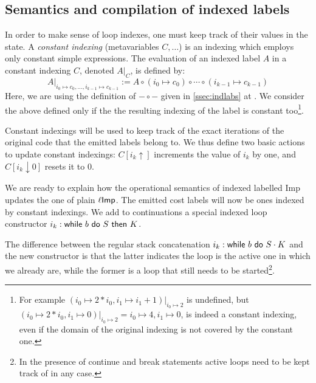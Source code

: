 \documentclass[submission,copyright,creativecommons]{eptcs}
\theoremstyle{definition}
\newcommand{\s}[1]{{\sf #1}}    \newcommand{\vc}[1]{{\bf #1}}
\newcommand{\imp}{{\sf Imp}}            \newcommand{\vm}{{\sf Vm}}              \newcommand{\mips}{{\sf Mips}}          \newcommand{\Clight}{{\sf Clight}}        \newcommand{\Cminor}{{\sf Cminor}}
\newcommand{\sop}[1]{\s{#1}\ }
\newcommand{\sbin}[1]{\ \s{#1}\ }
\newcommand{\alphab}{A}
\newcommand{\ass}{\mathrel{:=}}
\begin{document}
\subsection{Semantics and compilation of indexed labels}\label{ssec:inlabsem}\label{ssec3}
In order to make sense of loop indexes, one must keep track of their values in the state.
A \emph{constant indexing} (metavariables $C,\ldots$) is an indexing which employs only constant simple expressions.
The evaluation of an indexed label $\alphab$ in a constant indexing $C$, denoted $\alphab|_C$, is defined by:
$$
\alphab|_{i_0\mapsto c_0,\ldots, i_{k-1}\mapsto c_{k-1}} \ass \alphab\circ(i_0\mapsto c_0)\circ\cdots\circ(i_{k-1}\mapsto c_{k-1})
$$
Here, we are using the definition of ${-}\circ{-}$ given in \autoref{ssec:indlabs} at .
We consider the above defined only if the the resulting indexing of the label is constant too\footnote{For example $(i_0\mapsto 2*i_0,i_1\mapsto i_1+1)|_{i_0\mapsto 2}$ is undefined, but $(i_0\mapsto 2*i_0,i_1\mapsto 0)|_{i_0\mapsto 2}= i_0\mapsto 4,i_1\mapsto 0$, is indeed a constant indexing, even if the domain of the original indexing is not covered by the constant one.}.

Constant indexings will be used to keep track of the exact iterations of the original code that the emitted labels belong to.
We thus define two basic actions to update constant indexings: $C[i_k{\uparrow}]$ increments the value of $i_k$ by one, and $C[i_k{\downarrow}0]$ resets it to $0$.

We are ready to explain how the operational semantics of indexed labelled \imp{}
updates the one of plain $\ell\imp$.
The emitted cost labels will now be ones indexed by constant indexings.
We add to continuations a special indexed loop constructor
${i_k}:\sop{while} b \sbin {do} S \sbin{then} K$.

The difference between the regular stack concatenation $i_k:\sop{while}b\sbin{do}S\cdot K$ and the new constructor is that the latter indicates the loop is the active one in which we already are, while the former is a loop that still needs to be started\footnote{In the presence of \s{continue} and \s{break} statements active loops need to be kept track of in any case.}.
\end{document}
